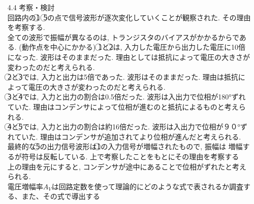 \documentclass[uplatex,a4paper,11pt,dvipdfmxs]{jsarticle}
\begin{document}
\begin{enumerate}
\begin{enumerate}
        \item[4.4] 考察・検討\\
        回路内の\textcircled{\scriptsize 1}~\textcircled{\scriptsize 5}の点で信号波形が逐次変化していくことが観察された. 
        その理由を考察する. \\

        全ての波形で振幅が異なるのは, トランジスタのバイアスがかかるからである. (動作点を中心にかかる)
        \textcircled{\scriptsize 1}と\textcircled{\scriptsize 2}は, 入力した電圧から出力した電圧に10倍になった. 
        波形はそのままだった. 理由としては抵抗によって電圧の大きさが変わったのだと考えられる.\\

        \textcircled{\scriptsize 2}と\textcircled{\scriptsize 3}では, 入力と出力は5倍であった. 波形はそのままだった. 
        理由は抵抗によって電圧の大きさが変わったのだと考えられる.\\

        \textcircled{\scriptsize 3}と\textcircled{\scriptsize 4}では, 入力と出力の割合は0.5倍だった. 
        波形は入出力で位相が180°ずれていた. 理由はコンデンサによって位相が進むのと抵抗によるものと考えられる.\\

        \textcircled{\scriptsize 4}と\textcircled{\scriptsize 5}では, 入力と出力の割合は約16倍だった. 波形は入出力で位相が９０°ずれていた. 
        理由はコンデンサが追加されてより位相が進んだと考えられる.\\ 

        最終的な\textcircled{\scriptsize 5}の出力信号波形は\textcircled{\scriptsize 1}の入力信号が増幅されたもので, 振幅は
        増幅するが符号は反転している. 上で考察したことをもとにその理由を考察する\\

        上の理由を元にすると, コンデンサが途中にあることで位相がずれたと考えられる. \\

        電圧増幅率\(A_V\)は回路定数を使って理論的にどのような式で表されるか調査する、また、その式で導出する\\


\end{enumerate}
\end{enumerate}
\end{document}
